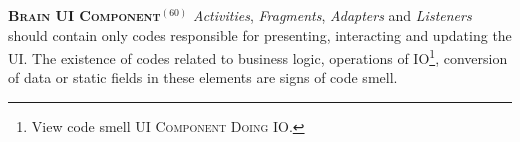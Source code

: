 




  \noindent
  \textsc{\textbf{{\small Brain UI Component}}}$^{(60)}$ \textit{Activities}, \textit{Fragments}, \textit{Adapters} and \textit{Listeners} should contain only codes responsible for presenting, interacting and updating the UI. The existence of codes related to business logic, operations of IO\footnote{View code smell \textsc{\small UI Component Doing IO}.}, conversion of data or static fields in these elements are signs of code smell.


